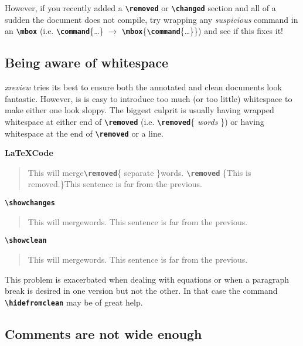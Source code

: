 \documentclass[a4paper]{ltxdoc}
\newcommand{\writecommand}[1]{\texttt{\textbf{{\textbackslash#1}}}}
\newcommand{\writearg}[1]{\{#1\}}
\begin{document}
However, if you recently added a \writecommand{removed} or \writecommand{changed} section and all of a sudden the document does not compile, try wrapping any \textit{suspicious} command in an \writecommand{mbox} (i.e. \writecommand{command}\writearg{\dots} $\rightarrow$ \writecommand{mbox}\{\writecommand{command}\writearg{\dots}\}) and see if this fixes it!

\subsection{Being aware of whitespace}

\textit{xreview} tries its best to ensure both the annotated and clean documents look fantastic. However, is is easy to introduce too much (or too little) whitespace to make either one look sloppy. The biggest culprit is usually having wrapped whitespace at either end of \writecommand{removed} (i.e. \writecommand{removed}\writearg{ \textit{words} }) or having whitespace at the end of \writecommand{removed} or a line.

\textbf{\LaTeX Code}

\begin{quote}
    This will merge\writecommand{removed}\writearg{ separate }words.
    \writecommand{removed} \writearg{This is removed.}\textvisiblespace This sentence is far from the previous. 
\end{quote}

\writecommand{showchanges}
\showchanges

\begin{quote}
    This will mergewords.
     This sentence is far from the previous. 
\end{quote}

\writecommand{showclean}
\showclean

\begin{quote}
    This will mergewords.
     This sentence is far from the previous. 
\end{quote}

\showchanges

This problem is exacerbated when dealing with equations or when a paragraph break is desired in one version but not the other. In that case the command \writecommand{hidefromclean} may be of great help.

\subsection{Comments are not wide enough}
\end{document}
